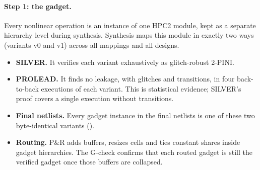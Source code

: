 \paragraph{Step 1: the gadget.}
Every nonlinear operation is an instance of one HPC2 module, kept as a separate hierarchy level during synthesis. Synthesis maps this module in exactly two ways (variants v0 and v1) across all mappings and all designs.
\begin{itemize}
  \item \textbf{SILVER.} It verifies each variant exhaustively as glitch-robust 2-PINI.
  \item \textbf{PROLEAD.} It finds no leakage, with glitches and transitions, in four back-to-back executions of each variant. This is statistical evidence; SILVER's proof covers a single execution without transitions.
  \item \textbf{Final netlists.} Every gadget instance in the final netlists is one of these two byte-identical variants ().
  \item \textbf{Routing.} P\&R adds buffers, resizes cells and ties constant shares inside gadget hierarchies. The G-check confirms that each routed gadget is still the verified gadget once those buffers are collapsed.
\end{itemize}

